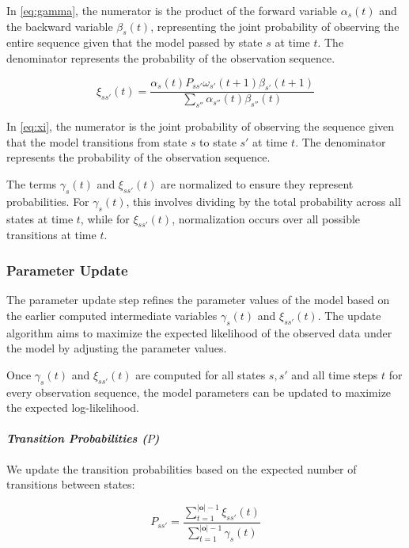 In \autoref{eq:gamma}, the numerator is the product of the forward variable $\alpha_s(t)$ and the backward variable $\beta_s(t)$, representing the joint probability of observing the entire sequence given that the model passed by state $s$ at time $t$.
The denominator represents the probability of the observation sequence.

\begin{equation}
    \xi_{ss'}(t) = \frac{\alpha_s(t) P_{ss'} \omega_{s'}(t + 1) \beta_{s'}(t + 1)}
    {\sum_{s''}\alpha_{s''}(t) \beta_{s''}(t)}
    \label{eq:xi}
\end{equation}


In \autoref{eq:xi}, the numerator is the joint probability of observing the sequence given that the model transitions from state $s$ to state $s'$ at time $t$.
The denominator represents the probability of the observation sequence.

The terms $\gamma_s(t)$ and $\xi_{ss'}(t)$ are normalized to ensure they represent probabilities.
For $\gamma_s(t)$, this involves dividing by the total probability across all states at time $t$, while for $\xi_{ss'}(t)$, normalization occurs over all possible transitions at time $t$.

\subsubsection{Parameter Update}
The parameter update step refines the parameter values of the model based on the earlier computed intermediate variables $\gamma_s(t)$ and $\xi_{ss'}(t)$.
The update algorithm aims to maximize the expected likelihood of the observed data under the model by adjusting the parameter values.

Once $\gamma_s(t)$ and $\xi_{ss'}(t)$ are computed for all states $s, s'$ and all time steps $t$ for every observation sequence, the model parameters can be updated to maximize the expected log-likelihood.

\paragraph*{\textit{Transition Probabilities ($P$)}}

We update the transition probabilities based on the expected number of transitions between states:


\begin{equation}
    P_{s s'} = \frac{\sum_{t = 1}^{|\mathbf{o}|-1} \xi_{ss'}(t)}{\sum_{t = 1}^{|\mathbf{o}|-1} \gamma_s(t)}
    \label{eq:transition-probabilities}
\end{equation}



